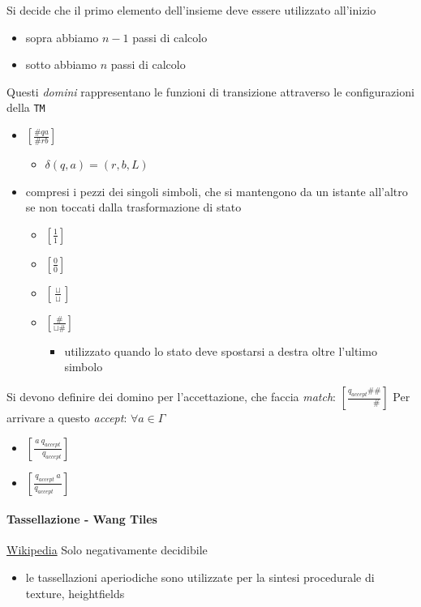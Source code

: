 \documentclass[
                        12pt, %
                        a4paper, %
                        oneside, %
                        headinclude,footinclude, %
                        BCOR5mm, %
                  ]{scrartcl}
\begin{document}
Si decide che il primo elemento dell'insieme deve essere utilizzato all'inizio
\begin{itemize}
\item sopra abbiamo \(n-1\) passi di calcolo
\item sotto abbiamo \(n\) passi di calcolo
\end{itemize}
Questi \emph{domini} rappresentano le funzioni di transizione attraverso le configurazioni della \texttt{TM}
\begin{itemize}
\item \([\frac{\#qa}{\#rb}]\)
\begin{itemize}
\item \(\delta(q,a) = (r,b,L)\)
\end{itemize}
\item compresi i pezzi dei singoli simboli, che si mantengono da un istante all'altro se non toccati dalla trasformazione di stato
\begin{itemize}
\item \([\frac{1}{1}]\)
\item \([\frac{0}{0}]\)
\item \([\frac{\sqcup}{\sqcup}]\)
\item \([\frac{\#}{\sqcup\#}]\)
\begin{itemize}
\item utilizzato quando lo stato deve spostarsi a destra oltre l'ultimo simbolo
\end{itemize}
\end{itemize}
\end{itemize}

Si devono definire dei domino per l'accettazione, che faccia \emph{match}:
\([\frac{q_{accept}\#\#}{\qquad \;\;\;\: \#}]\)
Per arrivare a questo \emph{accept}:
\(\forall a\in \Gamma\)
\begin{itemize}
\item \([\frac{a\: q_{accept}}{\quad q_{accept}}]\)
\item \([\frac{q_{accept} \: a}{q_{accept}\quad}]\)
\end{itemize}
\paragraph{Tassellazione - Wang Tiles}
\label{sec:org01c92a6}
\href{https://en.wikipedia.org/wiki/Wang\_tile}{Wikipedia}
Solo negativamente decidibile
\begin{itemize}
\item le tassellazioni aperiodiche sono utilizzate per la sintesi procedurale di texture, heightfields
\end{itemize}
\end{document}
